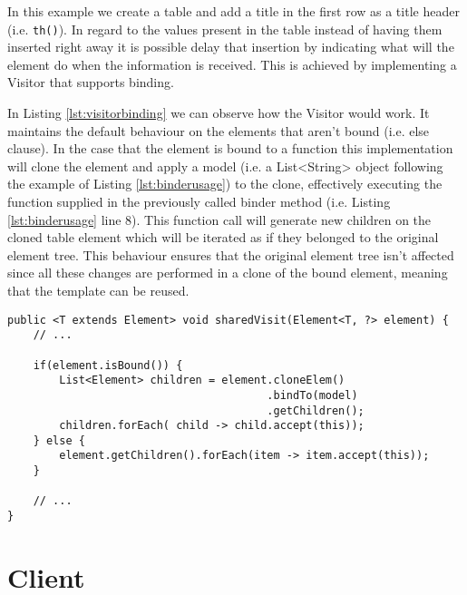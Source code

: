 \noindent
In this example we create a table and add a title in the first row as a title header (i.e. \texttt{th()}). In regard to the values present in the table instead of having them inserted right away it is possible delay that insertion by indicating what will the element do when the information is received. This is achieved by implementing a Visitor that supports binding. 

\noindent
In Listing \ref{lst:visitorbinding} we can observe how the Visitor would work. It maintains the default behaviour on the elements that aren't bound (i.e. else clause). In the case that the element is bound to a function this implementation will clone the element and apply a model (i.e. a List<String> object following the example of Listing \ref{lst:binderusage}) to the clone, effectively executing the function supplied in the previously called binder method (i.e. Listing \ref{lst:binderusage} line 8). This function call will generate new children on the cloned table element which will be iterated as if they belonged to the original element tree. This behaviour ensures that the original element tree isn't affected since all these changes are performed in a clone of the bound element, meaning that the template can be reused.

\bigskip


\begin{minipage}{\linewidth}
\begin{lstlisting}[caption={Visitor with binding support},label={lst:visitorbinding}]
public <T extends Element> void sharedVisit(Element<T, ?> element) {
    // ...
    
    if(element.isBound()) {
        List<Element> children = element.cloneElem()
                                        .bindTo(model)
                                        .getChildren();
        children.forEach( child -> child.accept(this));
    } else {
        element.getChildren().forEach(item -> item.accept(this));
    }
    
    // ...
}
\end{lstlisting}
\end{minipage}
        
\newpage

\section{Client} %
\label{sec:client}


